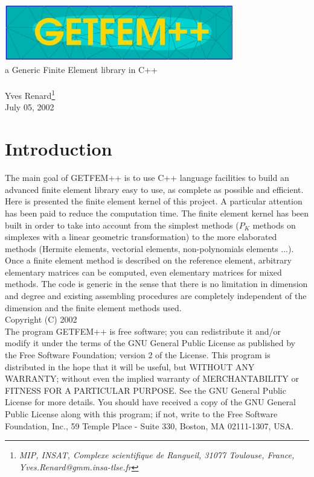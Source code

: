 \documentclass[11pt,a4paper]{article}
\begin{document}
\begin{center}
  \includegraphics[width=10cm,angle=0]{getfem_logo.eps}\\[0.2cm]
  a Generic Finite Element library in C++ \\[0.5cm]
   \\[0.5cm]
  { \large Yves \sc Renard\footnote{ \it MIP, INSAT, Complexe scientifique de Rangueil, 31077 Toulouse, France, Yves.Renard@gmm.insa-tlse.fr } } \\[1.0cm]
      July 05, 2002\\[1.0cm]
\end{center}




\section*{Introduction}
The main goal of GETFEM++ is to use C++ language facilities to build an advanced finite element library easy to use, as complete as possible and efficient. Here is presented the finite element kernel of this project. A particular attention has been paid to reduce the computation time. The finite element kernel has been built in order to take into account from the simplest methods ($P_K$ methods on simplexes with a linear geometric transformation) to the more elaborated methods (Hermite elements, vectorial elements, non-polynomials elements ...). Once a finite element method is described on the reference element, arbitrary elementary  matrices can be computed, even elementary matrices for mixed methods. The code is generic in the sense that there is no limitation in dimension and degree and existing assembling procedures are completely independent of the dimension and the finite element methods used.\\[4cm]
Copyright (C) 2002\\
The program GETFEM++ is free software; you can redistribute it and/or modify
it under the terms of the GNU General Public License as published by
the Free Software Foundation; version 2 of the License.
This program is distributed in the hope that it will be useful,
but WITHOUT ANY WARRANTY; without even the implied warranty of
MERCHANTABILITY or FITNESS FOR A PARTICULAR PURPOSE.  See the
GNU General Public License for more details.
You should have received a copy of the GNU General Public License
along with this program; if not, write to the Free Software Foundation,
Inc., 59 Temple Place - Suite 330, Boston, MA  02111-1307, USA.
\end{document}
